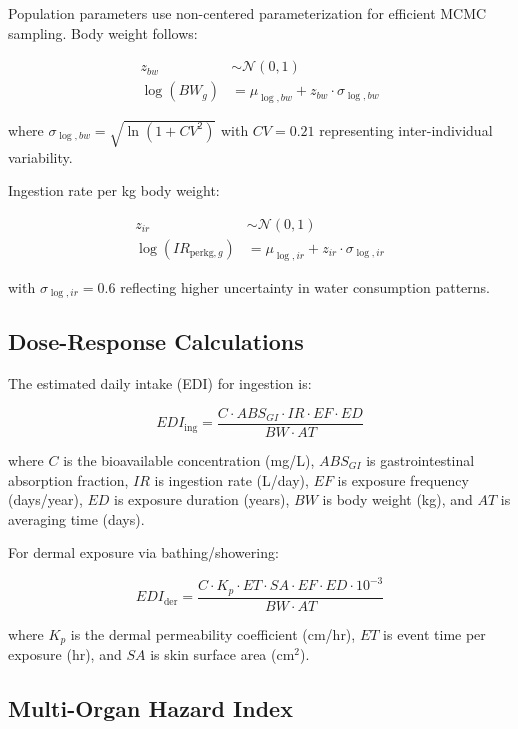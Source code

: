 \documentclass[11pt,a4paper]{article}
\begin{document}
Population parameters use non-centered parameterization for efficient MCMC sampling. Body weight follows:

\begin{align}
z_{bw} &\sim \mathcal{N}(0, 1) \\
\log(BW_g) &= \mu_{\log,bw} + z_{bw} \cdot \sigma_{\log,bw}
\end{align}

where $\sigma_{\log,bw} = \sqrt{\ln(1 + CV^2)}$ with $CV = 0.21$ representing inter-individual variability.

Ingestion rate per kg body weight:

\begin{align}
z_{ir} &\sim \mathcal{N}(0, 1) \\
\log(IR_{\text{perkg},g}) &= \mu_{\log,ir} + z_{ir} \cdot \sigma_{\log,ir}
\end{align}

with $\sigma_{\log,ir} = 0.6$ reflecting higher uncertainty in water consumption patterns.

\subsection{Dose-Response Calculations}

The estimated daily intake (EDI) for ingestion is:

\begin{equation}
EDI_{\text{ing}} = \frac{C \cdot ABS_{GI} \cdot IR \cdot EF \cdot ED}{BW \cdot AT}
\label{eq:edi_ing}
\end{equation}

where $C$ is the bioavailable concentration (mg/L), $ABS_{GI}$ is gastrointestinal absorption fraction, $IR$ is ingestion rate (L/day), $EF$ is exposure frequency (days/year), $ED$ is exposure duration (years), $BW$ is body weight (kg), and $AT$ is averaging time (days).

For dermal exposure via bathing/showering:

\begin{equation}
EDI_{\text{der}} = \frac{C \cdot K_p \cdot ET \cdot SA \cdot EF \cdot ED \cdot 10^{-3}}{BW \cdot AT}
\label{eq:edi_der}
\end{equation}

where $K_p$ is the dermal permeability coefficient (cm/hr), $ET$ is event time per exposure (hr), and $SA$ is skin surface area (cm$^2$).

\subsection{Multi-Organ Hazard Index}
\end{document}
